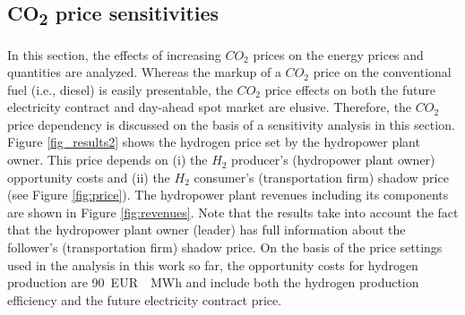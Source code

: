 \documentclass[review]{elsarticle}
\begin{document}
\subsection{CO\textsubscript{2} price sensitivities}\label{res:3_CO2}
In this section, the effects of increasing $CO_2$ prices on the energy prices and quantities are analyzed. Whereas the markup of a $CO_2$ price on the conventional fuel (i.e., diesel) is easily presentable, the $CO_2$ price effects on both the future electricity contract and day-ahead spot market are elusive. Therefore, the $CO_2$ price dependency is discussed on the basis of a sensitivity analysis in this section. Figure \ref{fig_results2} shows the hydrogen price set by the hydropower plant owner. This price depends on (i) the $H_2$ producer's (hydropower plant owner) opportunity costs and (ii) the $H_2$ consumer's (transportation firm) shadow price (see Figure \ref{fig:price}). The hydropower plant revenues including its components are shown in Figure \ref{fig:revenues}. Note that the results take into account the fact that the hydropower plant owner (leader) has full information about the follower's (transportation firm) shadow price. On the basis of the price settings used in the analysis in this work so far, the opportunity costs for hydrogen production are \SI{90}{EUR \per MWh} and include both the hydrogen production efficiency and the future electricity contract price. 
\end{document}
